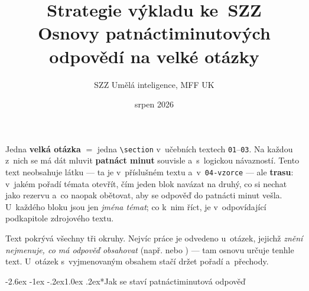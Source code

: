 \documentclass[11pt,a4paper]{article}
\title{\textbf{Strategie výkladu ke~SZZ}\\[2mm]
\large Osnovy patnáctiminutových odpovědí na velké otázky}
\author{SZZ Umělá inteligence, MFF UK}
\date{srpen 2026}
\makeatletter
\renewcommand\section{\@startsection{section}{1}{\z@}%
  {-2.6ex \@plus -1ex \@minus -.2ex}{1.0ex \@plus.2ex}{\normalfont\Large\bfseries}}
\makeatother
\begin{document}
\maketitle

\begin{center}
\begin{minipage}{0.93\textwidth}
\small
Jedna \textbf{velká otázka} $=$ jedna \texttt{\textbackslash section} v~učebních textech
\texttt{01}--\texttt{03}. Na každou z~nich se má dát mluvit \textbf{patnáct minut} souvisle
a~s~logickou návazností. Tento text neobsahuje látku --- ta je v~příslušném textu
a~v~\texttt{04-vzorce} --- ale \textbf{trasu}: v~jakém pořadí témata otevřít, čím jeden blok
navázat na druhý, co si nechat jako rezervu a~co naopak obětovat, aby se odpověď do patnácti
minut vešla. U~každého bloku jsou jen \emph{jména témat}; co k~nim říct, je v~odpovídající
podkapitole zdrojového textu.

Text pokrývá všechny tři okruhy. Nejvíc práce je odvedeno u~otázek, jejichž \emph{znění
nejmenuje, co má odpověď obsahovat} (např.  nebo ) --- tam osnovu určuje tenhle text. U~otázek s~vyjmenovaným
obsahem stačí držet pořadí a~přechody.
\end{minipage}
\end{center}

\vspace{2mm}

\section*{Jak se staví patnáctiminutová odpověď}
\end{document}
